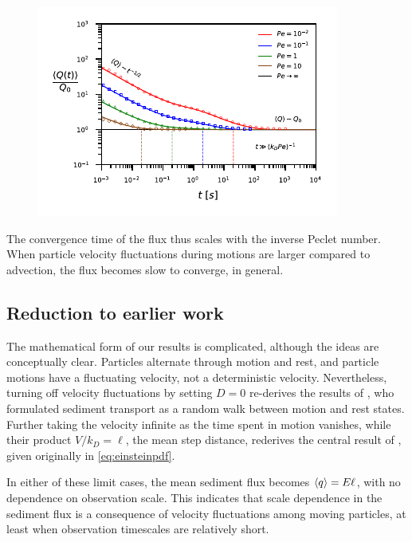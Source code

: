 \begin{figure}[!htbp]
	\includegraphics[width=\linewidth,keepaspectratio]{figures/ch2/figure3_slopeKey.pdf}
	\caption{}
	\label{fig:fluxconvergence}
\end{figure}
The convergence time of the flux thus scales with the inverse Peclet number. When particle velocity fluctuations during motions are larger compared to advection, the flux becomes slow to converge, in general. 

\subsection{Reduction to earlier work}

The mathematical form of our results is complicated, although the ideas are conceptually clear. Particles alternate through motion and rest, and particle motions have a fluctuating velocity, not a deterministic velocity. 
Nevertheless, turning off velocity fluctuations by setting $D=0$ re-derives the results of \citet{Lisle1998}, who formulated sediment transport as a random walk between motion and rest states.
Further taking the velocity infinite as the time spent in motion vanishes, while their product $V/k_D = \ell$, the mean step distance, rederives the central result of \citet{Einstein1937}, given originally in \ref{eq:einsteinpdf}.

In either of these limit cases, the mean sediment flux becomes $\langle q \rangle = E \ell$, with no dependence on observation scale. This indicates that scale dependence in the sediment flux is a consequence of velocity fluctuations among moving particles, at least when observation timescales are relatively short.
 
